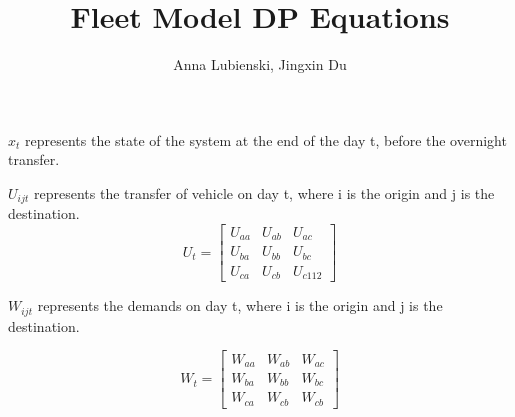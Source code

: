 \documentclass{article}
\title{Fleet Model DP Equations}
\author{Anna Lubienski, Jingxin Du}
\begin{document}
\maketitle

$x_{t}$ represents the state of the system at the end of the day t, before the overnight transfer.

$U_{ijt}$ represents the transfer of vehicle on day t, where i is the origin and j is the destination.
$$
U_t = 
\begin{bmatrix}
U_{aa} & U_{ab} & U_{ac}\\
U_{ba} & U_{bb} & U_{bc}\\
U_{ca} & U_{cb} & U_{c112}
\end{bmatrix}
$$

$W_{ijt}$ represents the demands on day t, where i is the origin and j is the destination.

$$
W_t = 
\begin{bmatrix}
W_{aa} & W_{ab} & W_{ac}\\
W_{ba} & W_{bb} & W_{bc}\\
W_{ca} & W_{cb} & W_{cb}
\end{bmatrix}
$$
\end{document}
